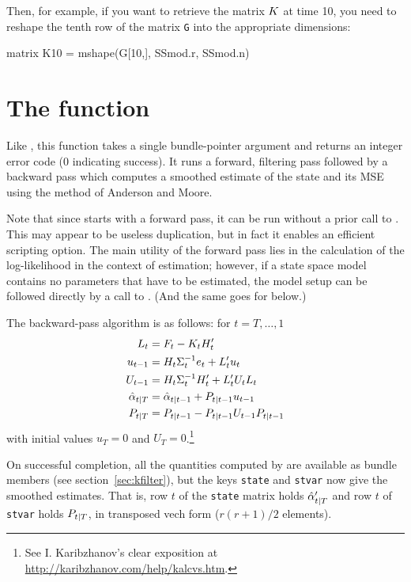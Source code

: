 Then, for example, if you want to retrieve the matrix $K$ at time
10, you need to reshape the tenth row of the matrix \texttt{G} into
the appropriate dimensions:
\begin{code}
matrix K10 = mshape(G[10,], SSmod.r, SSmod.n)  
\end{code}

\section{The  function}
\label{sec:ksmooth}

Like , this function takes a single bundle-pointer
argument and returns an integer error code (0 indicating success).  It
runs a forward, filtering pass followed by a backward pass which
computes a smoothed estimate of the state and its MSE using the method
of Anderson and Moore.

Note that since  starts with a forward pass, it can be
run without a prior call to . This may appear to be
useless duplication, but in fact it enables an efficient scripting
option.  The main utility of the forward pass lies in the calculation
of the log-likelihood in the context of estimation; however, if a
state space model contains no parameters that have to be estimated,
the model setup can be followed directly by a call to
. (And the same goes for  below.)

The backward-pass algorithm is as follows: for $t=T,\dots,1$
%
\begin{align*}
L_t &= F_t - K_t H_t' \\
u_{t-1} &= H_t \Sigma_t^{-1} e_t 
 + L_t' u_t \\
U_{t-1} &= H_t \Sigma_t^{-1} H_t' + 
  L_t' U_t L_t \\
\hat{\alpha}_{t|T} &= \hat{\alpha}_{t|t-1} + 
  P_{t|t-1} u_{t-1} \\
P_{t|T} &= P_{t|t-1} - 
  P_{t|t-1} U_{t-1} P_{t|t-1}
\end{align*}
%
with initial values $u_T = 0$ and $U_T =
0$.\footnote{See I. Karibzhanov's clear exposition at
\url{http://karibzhanov.com/help/kalcvs.htm}.}

On successful completion, all the quantities computed by
 are available as bundle members (see
section~\ref{sec:kfilter}), but the keys \texttt{state} and
\texttt{stvar} now give the smoothed estimates.  That is, row $t$ of
the \texttt{state} matrix holds $\hat{\alpha}_{t|T}'$ and row $t$
of \texttt{stvar} holds $P_{t|T}$, in transposed vech form
($r(r+1)/2$ elements).

